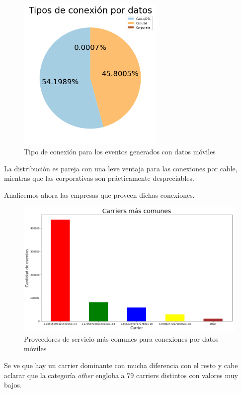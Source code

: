 \documentclass[a4paper, 12pt]{article}
\begin{document}
		\FloatBarrier
		\begin{figure}[h]
			\centering
			\includegraphics[width=200pt]{images/events/eventsxdatos.png}
			\caption{Tipo de conexión para los eventos generados con datos móviles}
		\end{figure}
		\FloatBarrier
		
		La distribución es pareja con una leve ventaja para las conexiones por cable, mientras que las corporativas son prácticamente despreciables.
		
		Analicemos ahora las empresas que proveen dichas conexiones.
		
		\FloatBarrier
		\begin{figure}[h]
			\centering
			\includegraphics[width=\textwidth]{images/events/carriers.png}
			\caption{Proveedores de servicio más comunes para conexiones por datos móviles}
		\end{figure}
		\FloatBarrier
	
		Se ve que hay un carrier dominante con mucha diferencia con el resto y cabe aclarar que la categoría \textit{other} engloba a 79 carriers distintos con valores muy bajos.
		
\end{document}

